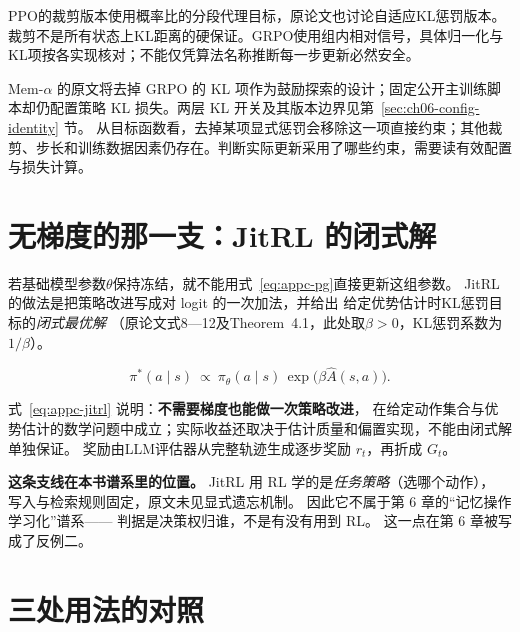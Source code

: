 PPO的裁剪版本使用概率比的分段代理目标，原论文也讨论自适应KL惩罚版本\cite{ppo-1707}。裁剪不是所有状态上KL距离的硬保证。GRPO使用组内相对信号，具体归一化与KL项按各实现核对；不能仅凭算法名称推断每一步更新必然安全。

\begin{sloppypar}
Mem-$\alpha$ 的原文将去掉 GRPO 的 KL 项作为鼓励探索的设计\cite{memalpha-2509}；固定公开主训练脚本却仍配置策略 KL 损失\cite{memalpha-code-2025}。两层 KL 开关及其版本边界见第~\ref{sec:ch06-config-identity} 节。
从目标函数看，去掉某项显式惩罚会移除这一项直接约束；其他裁剪、步长和训练数据因素仍存在。判断实际更新采用了哪些约束，需要读有效配置与损失计算。
\end{sloppypar}

\section{无梯度的那一支：JitRL 的闭式解}
\label{sec:appc-jitrl}

若基础模型参数$\theta$保持冻结，就不能用式~\eqref{eq:appc-pg}直接更新这组参数。
JitRL 的做法是把策略改进写成对 logit 的一次加法，并给出
给定优势估计时KL惩罚目标的\emph{闭式最优解}\cite{jitrl-2601}
（原论文式8—12及Theorem~4.1，此处取$\beta>0$，KL惩罚系数为$1/\beta$）。

\begin{equation}
\pi^{*}(a\mid s)\ \propto\ \pi_{\theta}(a\mid s)\,
\exp\!\big(\beta\widehat A(s,a)\big).
\label{eq:appc-jitrl}
\end{equation}

式~\eqref{eq:appc-jitrl} 说明：\textbf{不需要梯度也能做一次策略改进}，
在给定动作集合与优势估计的数学问题中成立；实际收益还取决于估计质量和偏置实现，不能由闭式解单独保证。
奖励由LLM评估器从完整轨迹生成逐步奖励 $r_t$，再折成 $G_t$\cite{jitrl-2601}。

\begin{principlebox}
\textbf{这条支线在本书谱系里的位置。}
JitRL 用 RL 学的是\emph{任务策略}（选哪个动作），
写入与检索规则固定，原文未见显式遗忘机制\cite{jitrl-2601}。
因此它不属于第 6 章的``记忆操作学习化''谱系——
判据是决策权归谁，不是有没有用到 RL。
这一点在第 6 章被写成了反例二。
\end{principlebox}

\section{三处用法的对照}
\label{sec:appc-table}

